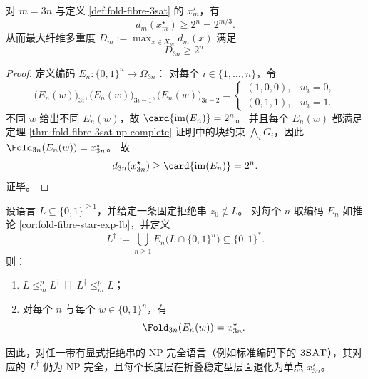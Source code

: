 \begin{corollary}[单一稳定型的显式指数纤维下界]\label{cor:fold-fibre-star-exp-lb}
对 \(m=3n\) 与定义 \ref{def:fold-fibre-3sat} 的 \(x^\star_m\)，有
\[
d_m(x^\star_m)\ge 2^n=2^{m/3}.
\]
从而最大纤维多重度 \(D_m:=\max_{x\in X_m}d_m(x)\) 满足
\[
D_{3n}\ge 2^n.
\]
\end{corollary}

\begin{proof}
定义编码 \(E_n:\{0,1\}^n\to\Omega_{3n}\)：
对每个 \(i\in\{1,\dots,n\}\)，令
\[
\bigl(E_n(w)\bigr)_{3i},\bigl(E_n(w)\bigr)_{3i-1},\bigl(E_n(w)\bigr)_{3i-2}
=
\begin{cases}
(1,0,0),& w_i=0,\\
(0,1,1),& w_i=1.
\end{cases}
\]
不同 \(w\) 给出不同 \(E_n(w)\)，故 \(\card{\mathrm{im}(E_n)}=2^n\)。
并且每个 \(E_n(w)\) 都满足定理 \ref{thm:fold-fibre-3sat-np-complete} 证明中的块约束 \(\bigwedge_i G_i\)，因此
\(
\Fold_{3n}(E_n(w))=x^\star_{3n}
\)。
故
\[
d_{3n}(x^\star_{3n})
\ge
\card{\mathrm{im}(E_n)}
=2^n.
\]
证毕。
\end{proof}

\begin{proposition}[长度层折叠退化下的复杂性保真编码]\label{prop:fold-layerwise-degenerate-hardness}
设语言 \(L\subseteq\{0,1\}^{\ge 1}\)，并给定一条固定拒绝串 \(z_0\notin L\)。
对每个 \(n\) 取编码 \(E_n\) 如推论 \ref{cor:fold-fibre-star-exp-lb}，并定义
\[
L^\dagger:=\bigcup_{n\ge 1}E_n\!\bigl(L\cap\{0,1\}^n\bigr)\subseteq\{0,1\}^\ast.
\]
则：
\begin{enumerate}
  \item \(L\le_m^p L^\dagger\) 且 \(L^\dagger\le_m^p L\)；
  \item 对每个 \(n\) 与每个 \(w\in\{0,1\}^n\)，有
  \[
  \Fold_{3n}(E_n(w))=x^\star_{3n}.
  \]
\end{enumerate}
因此，对任一带有显式拒绝串的 NP 完全语言（例如标准编码下的 \(\text{\normalfont\textsc{3SAT}}\)），其对应的 \(L^\dagger\) 仍为 NP 完全，且每个长度层在折叠稳定型层面退化为单点 \(x^\star_{3n}\)。
\end{proposition}

